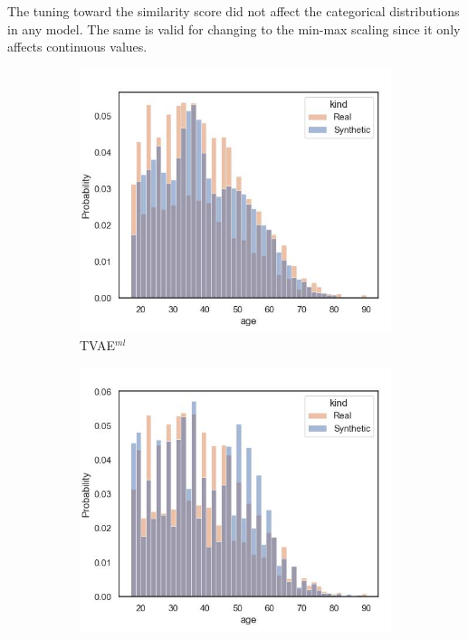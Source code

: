 The tuning toward the similarity score did not affect the categorical distributions in any model.
The same is valid for changing to the min-max scaling since it only affects continuous values.


\begin{figure}[h]
	\centering
	\begin{subfigure}{0.32\textwidth}
		\centering
		\includegraphics[width=\textwidth]{images/dist_age/tvae.jpg}
		\caption{TVAE$^{ml}$}
	\end{subfigure}
	\begin{subfigure}{0.32\textwidth}
		\centering
		\includegraphics[width=\textwidth]{images/dist_age/ctabgan.jpg}

\end{subfigure}
\end{figure}
